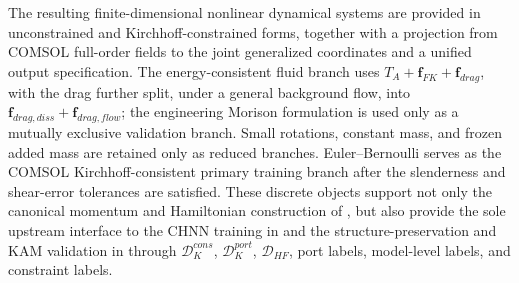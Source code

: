 The resulting finite-dimensional nonlinear dynamical systems are provided in unconstrained and Kirchhoff-constrained forms, together with a projection from COMSOL full-order fields to the joint generalized coordinates and a unified output specification. The energy-consistent fluid branch uses \(T_{A} + \mathbf{f}_{FK} + \mathbf{f}_{drag}\), with the drag further split, under a general background flow, into \(\mathbf{f}_{drag,diss} + \mathbf{f}_{drag,flow}\); the engineering Morison formulation is used only as a mutually exclusive validation branch. Small rotations, constant mass, and frozen added mass are retained only as reduced branches. Euler--Bernoulli serves as the COMSOL Kirchhoff-consistent primary training branch after the slenderness and shear-error tolerances are satisfied. These discrete objects support not only the canonical momentum and Hamiltonian construction of , but also provide the sole upstream interface to the CHNN training in  and the structure-preservation and KAM validation in  through \(\mathcal{D}_{K}^{cons}\), \(\mathcal{D}_{K}^{port}\), \(\mathcal{D}_{HF}\), port labels, model-level labels, and constraint labels.
